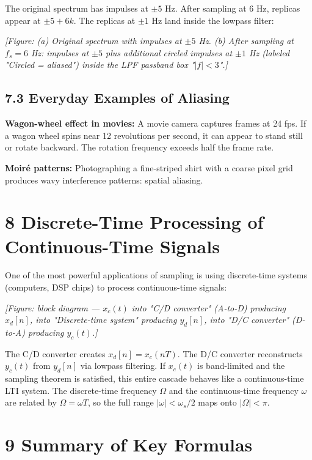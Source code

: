 \documentclass[11pt]{article}
\begin{document}
The original spectrum has impulses at $\pm 5$ Hz. After sampling at 6 Hz, replicas appear at $\pm 5 + 6k$. The replicas at $\pm 1$ Hz land inside the lowpass filter:

\textit{[Figure: (a) Original spectrum with impulses at $\pm 5$ Hz. (b) After sampling at $f_s = 6$ Hz: impulses at $\pm 5$ plus additional circled impulses at $\pm 1$ Hz (labeled "Circled = aliased") inside the LPF passband box "$|f| < 3$".]}

\subsection*{7.3 Everyday Examples of Aliasing}

\textbf{Wagon-wheel effect in movies:} A movie camera captures frames at 24 fps. If a wagon wheel spins near 12 revolutions per second, it can appear to stand still or rotate backward. The rotation frequency exceeds half the frame rate.

\textbf{Moiré patterns:} Photographing a fine-striped shirt with a coarse pixel grid produces wavy interference patterns: spatial aliasing.

\section*{8 Discrete-Time Processing of Continuous-Time Signals}

One of the most powerful applications of sampling is using discrete-time systems (computers, DSP chips) to process continuous-time signals:

\textit{[Figure: block diagram — $x_c(t)$ into "C/D converter" (A-to-D) producing $x_d[n]$, into "Discrete-time system" producing $y_d[n]$, into "D/C converter" (D-to-A) producing $y_c(t)$.]}

The C/D converter creates $x_d[n] = x_c(nT)$. The D/C converter reconstructs $y_c(t)$ from $y_d[n]$ via lowpass filtering. If $x_c(t)$ is band-limited and the sampling theorem is satisfied, this entire cascade behaves like a continuous-time LTI system. The discrete-time frequency $\Omega$ and the continuous-time frequency $\omega$ are related by $\Omega = \omega T$, so the full range $|\omega| < \omega_s/2$ maps onto $|\Omega| < \pi$.

\section*{9 Summary of Key Formulas}
\end{document}
